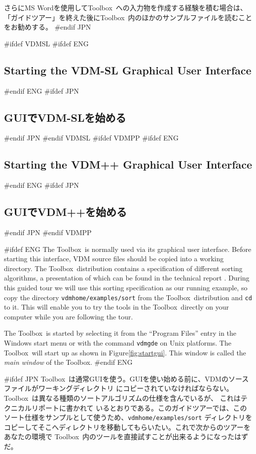 \documentclass[\pformat,12pt]{article}
\newcommand{\Toolbox}{Toolbox}
\newcommand{\vdmgde}{vdmgde}
\newcommand{\vdmhome}{vdmhome}
\newcommand{\Toolbox}{Toolbox}
\newcommand{\vdmgde}{vppgde}
\newcommand{\vdmhome}{vpphome}
\begin{document}
さらにMS Wordを使用して\Toolbox\ への入力物を作成する経験を積む場合は、
「ガイドツアー」を終えた後に\Toolbox\ 内のほかのサンプルファイルを読むことをお勧めする。
#endif JPN


#ifdef VDMSL
#ifdef ENG
\subsection{Starting the VDM-SL Graphical User Interface} 
#endif ENG
#ifdef JPN
\subsection{GUIでVDM-SLを始める} 
#endif JPN
#endif VDMSL
#ifdef VDMPP
#ifdef ENG
\subsection{Starting the VDM++ Graphical User Interface} 
#endif ENG
#ifdef JPN
\subsection{GUIでVDM++を始める} 
#endif JPN
#endif VDMPP

#ifdef ENG
The \Toolbox\ is normally used via its graphical user interface. Before
starting this interface, VDM source files should be copied into a
working directory. The \Toolbox\ distribution contains a specification
of different sorting algorithms, a presentation of which can be found
in the technical report
.  During
this guided tour we will use this sorting specification as our running
example, so copy the directory {\tt \vdmhome/examples/sort} from the
\Toolbox\ distribution and {\tt cd} to it.  This will enable you to
try the tools in the \Toolbox\ directly on your computer while you are
following the tour.

The \Toolbox\ is started by selecting it from the ``Program Files''
entry in the Windows start menu or with the command {\tt \vdmgde}
 on Unix platforms. The \Toolbox\ 
will start up as shown in Figure\ref{fig:startgui}. This window is
called the {\em main window\/} of the \Toolbox.
#endif ENG

#ifdef JPN
\Toolbox\ は通常GUIを使う。GUIを使い始める前に、VDMのソースファイルがワーキングディレクトリ
にコピーされていなければならない。\Toolbox\ は異なる種類のソートアルゴリズムの仕様を含んでいるが、
これはテクニカルリポートに書かれて
いるとおりである。このガイドツアーでは、このソート仕様をサンプルとして使うため、{\tt \vdmhome/examples/sort}
ディレクトリをコピーしてそこへディレクトリを移動してもらいたい。これで次からのツアーをあなたの環境で
\Toolbox\ 内のツールを直接試すことが出来るようになったはずだ。
\end{document}
